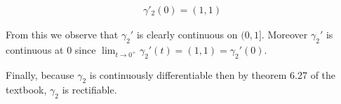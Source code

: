 \documentclass{article}
\begin{document}
  \begin{align*}
    \gamma'_2(0) = (1,1)
  \end{align*}

  From this we observe that $\gamma_2'$ is clearly continuous on $(0,1]$.  Moreover $\gamma_2'$ is continuous at 0 since $\displaystyle\lim_{t\to 0^+}\gamma_2'(t) = (1,1) = \gamma_2'(0)$.

  Finally, because $\gamma_2$ is continuously differentiable then by theorem 6.27 of the textbook, $\gamma_2$ is rectifiable.  
\end{document}
